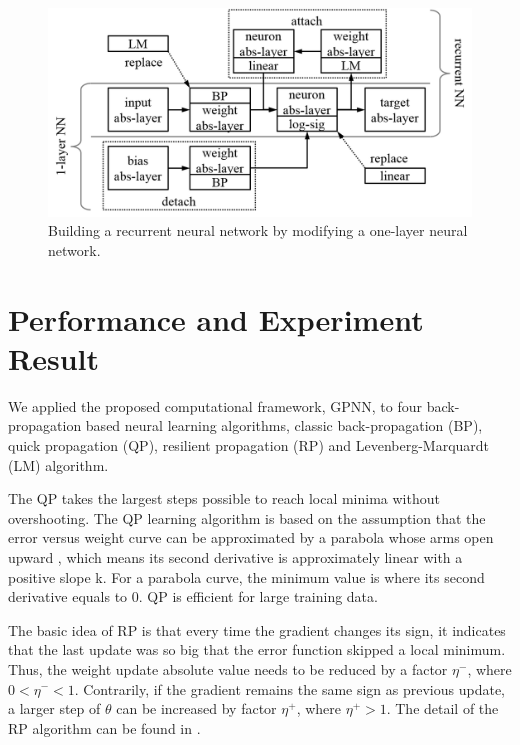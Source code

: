 \documentclass[procedia]{easychair}
\begin{document}
\begin{figure}[h]
    \begin{centering}
        \includegraphics[scale=0.5]{../pic/reusability.png}
        \caption{Building a recurrent neural network by modifying a one-layer neural network.}
        \label{fig:reusability}
	\end{centering}
\end{figure}


\section{Performance and Experiment Result}
\label{section:performance}

We applied the proposed computational framework, GPNN, to four back-propagation based neural learning algorithms, classic back-propagation (BP), quick propagation (QP), resilient propagation (RP) and Levenberg-Marquardt (LM) algorithm.

The QP takes the largest steps possible to reach local minima without overshooting.  The QP learning algorithm is based on the assumption that the error versus weight curve can be approximated by a parabola whose arms open upward \cite{fahlman1988empirical}, which means its second derivative is approximately linear with a positive slope k.  For a parabola curve, the minimum value is where its second derivative equals to 0.  QP is efficient for large training data.

The basic idea of RP is that every time the gradient changes its sign, it indicates that the last update was so big that the error function skipped a local minimum.  Thus, the weight update absolute value needs to be reduced by a factor $ \eta ^ - $, where $ 0 < \eta ^ - < 1 $.  Contrarily, if the gradient remains the same sign as previous update, a larger step of $\theta$ can be increased by factor  $ \eta ^ + $, where $ \eta ^ + > 1 $.  The detail of the RP algorithm can be found in \cite{riedmiller1993direct}.
\end{document}

